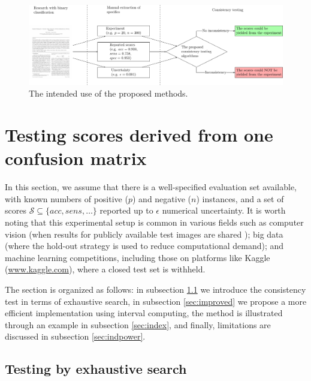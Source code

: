\documentclass[3p, times]{elsarticle}
\begin{document}
\begin{figure}
\begin{center}
\includegraphics[width=\textwidth]{flowchart/figure.pdf}
\end{center}
\caption{The intended use of the proposed methods.}
\label{fig:illustration}
\end{figure}

\section{Testing scores derived from one confusion matrix}
\label{sec:ind}

In this section, we assume that there is a well-specified evaluation set available, with known numbers of positive ($p$) and negative ($n$) instances, and a set of scores $\mathcal{S}\subseteq\lbrace acc, sens, \dots\rbrace$ reported up to $\epsilon$ numerical uncertainty. 
It is worth noting that this experimental setup is common in various fields such as computer vision (when results for publicly available test images are shared \cite{vessel, isic2016}); big data (where the hold-out strategy is used to reduce computational demand); and machine learning competitions, including those on platforms like Kaggle (\url{www.kaggle.com}), where a closed test set is withheld.

The section is organized as follows: in subsection \ref{sec:rommat} we introduce the consistency test in terms of exhaustive search, in subsection \ref{sec:improved} we propose a more efficient implementation using interval computing, the method is illustrated through an example in subsection \ref{sec:index}, {\color{blue} and finally, limitations are discussed in subsection \ref{sec:indpower}}.

\subsection{Testing by exhaustive search}
\label{sec:rommat}
\end{document}
